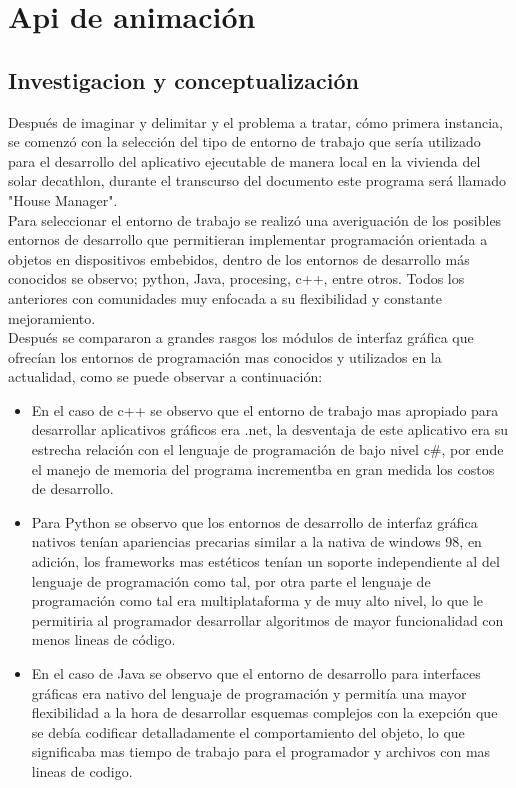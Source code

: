 \section{Api de animación}
\subsection{Investigacion y conceptualización}
Después de imaginar y delimitar  y el problema a tratar, cómo primera instancia, se comenzó con la selección del tipo de entorno de trabajo que sería utilizado para el desarrollo del aplicativo ejecutable de manera local en la vivienda del solar decathlon, durante el transcurso del documento este programa será llamado "House Manager".
\vspace{0.5cm}\\
Para seleccionar el entorno de trabajo se realizó una averiguación de los posibles entornos de desarrollo que permitieran implementar programación orientada a objetos en dispositivos embebidos, dentro de los entornos de desarrollo más conocidos se observo; python, Java, procesing, c++, entre otros. Todos los anteriores con comunidades muy enfocada a su flexibilidad y constante mejoramiento.
\vspace{0.5cm}\\
Después se compararon a grandes rasgos los módulos de interfaz gráfica que ofrecían los entornos de programación mas conocidos y utilizados en la actualidad, como se puede observar a continuación:
\begin{itemize}
	\item En el caso de c++ se observo que el entorno de trabajo mas apropiado para desarrollar aplicativos gráficos era .net, la desventaja de este aplicativo era su estrecha relación con el lenguaje de programación de bajo nivel c\#, por ende el manejo de memoria del programa incrementba en gran medida los costos de desarrollo.
	
	\item Para Python se observo que los entornos de desarrollo de interfaz gráfica nativos tenían apariencias precarias similar a la nativa de windows 98, en adición, los frameworks mas estéticos tenían un soporte independiente al del lenguaje de programación como tal, por otra parte el lenguaje de programación como tal era multiplataforma y de muy alto nivel, lo que le permitiria al programador desarrollar algoritmos de mayor funcionalidad con menos lineas de código.
	
	\item En el caso de Java se observo que el entorno de desarrollo para interfaces gráficas era nativo del lenguaje de programación y permitía una mayor flexibilidad a la hora de desarrollar esquemas complejos con la exepción que se debía codificar detalladamente el comportamiento del objeto, lo que significaba mas tiempo de trabajo para el programador y archivos con mas lineas de codigo.
\end{itemize}

